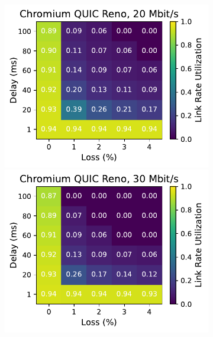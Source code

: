 \begin{figure}[ht]
\begin{subfigure}[b]{0.22\linewidth}
        \includegraphics[width=\linewidth,trim={0 0 2cm 0},clip]{splitting/figures/heatmaps/heatmap_quic_reno_20mbps.pdf}
        \includegraphics[width=\linewidth,trim={0 0 2cm 0},clip]{splitting/figures/heatmaps/heatmap_quic_reno_30mbps.pdf}

\end{subfigure}
\end{figure}
